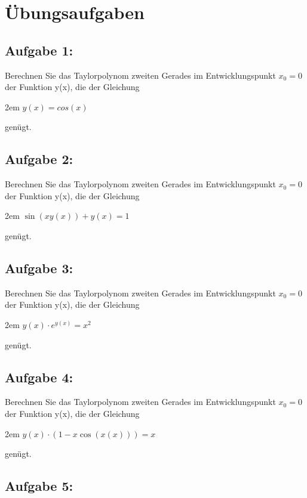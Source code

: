 \documentclass[11pt,final]{scrreprt}
\begin{document}
\newpage
\section{Übungsaufgaben}

\subsection*{Aufgabe 1:}

Berechnen Sie das Taylorpolynom zweiten Gerades im Entwicklungspunkt $x_0=0$ der Funktion y(x), die der Gleichung 

\begingroup
\leftskip2em 
$ y(x) = cos(x) $
\par	
\endgroup 

genügt. 

\subsection*{Aufgabe 2:}

Berechnen Sie das Taylorpolynom zweiten Gerades im Entwicklungspunkt $x_0=0$ der Funktion y(x), die der Gleichung 

\begingroup
\leftskip2em 
$ \sin(xy(x))+y(x)=1 $
\par	
\endgroup 

genügt. 

\subsection*{Aufgabe 3:}

Berechnen Sie das Taylorpolynom zweiten Gerades im Entwicklungspunkt $x_0=0$ der Funktion y(x), die der Gleichung 

\begingroup
\leftskip2em 
$ y(x) \cdot e^{y(x)}=x^2 $
\par	
\endgroup 

genügt. 

\subsection*{Aufgabe 4:}

Berechnen Sie das Taylorpolynom zweiten Gerades im Entwicklungspunkt $x_0=0$ der Funktion y(x), die der Gleichung 

\begingroup
\leftskip2em 
$ y(x)\cdot(1-x\cos(x(x)))=x $
\par	
\endgroup 

genügt. 

\subsection*{Aufgabe 5:}
\end{document}
